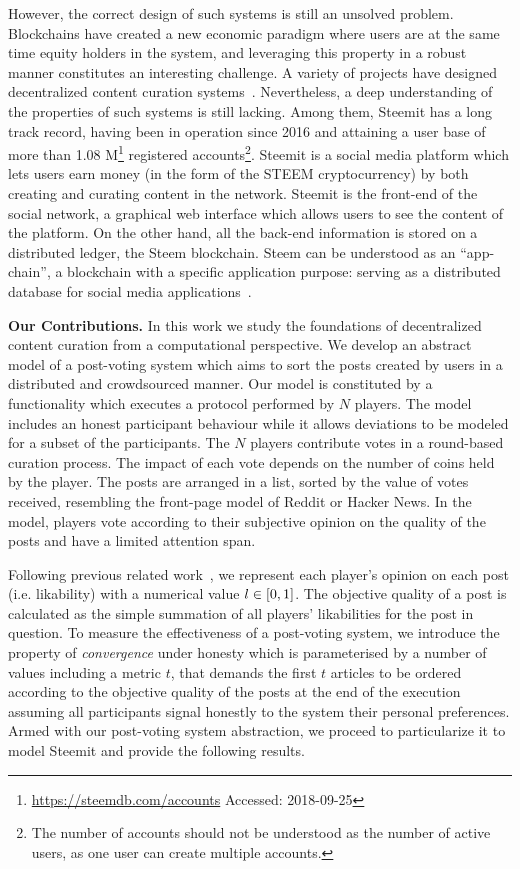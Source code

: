    However, the correct design of such systems is still an unsolved problem. Blockchains have created a new economic paradigm where users are at the same time equity holders in the system, and leveraging this property in a robust manner constitutes an interesting challenge.
   A variety of projects have designed decentralized content curation systems~\cite{synereo,steemit,tcr}. Nevertheless, a deep understanding of the properties of such systems is still lacking. Among them, Steemit
has a long track record, having been in operation since 2016 and attaining a user base of more than 1.08 M\footnote{\url{https://steemdb.com/accounts} Accessed: 2018-09-25} registered accounts\footnote{The number of accounts should not be understood as the number of active users, as one user can create multiple accounts.}. Steemit is a social media platform which lets users earn money (in the form of the STEEM cryptocurrency) by both creating and curating content in the network. Steemit is the front-end of the social network, a graphical web interface which allows users to see the content of the platform. On the other hand, all the back-end information is stored on a distributed ledger, the Steem blockchain. Steem can be understood as an ``app-chain'', a blockchain with a specific application purpose: serving as a distributed database for social media applications~\cite{steemit}.

\noindent  \textbf{Our Contributions.}
In this work we study the foundations of decentralized content curation from a computational perspective. We develop an abstract model of a post-voting system which aims to sort the posts created by users in a distributed and crowdsourced manner.
  Our model is constituted by a functionality which executes a protocol performed by $N$ players. The model includes an honest participant behaviour while it allows deviations to be modeled for a subset of the participants.      The $N$ players contribute votes in a round-based curation process. The impact of each vote depends on the number of coins held by the player.
   The posts are arranged in a list, sorted by the value of votes received, resembling the front-page model of Reddit or Hacker News. In the model, players vote according to their subjective opinion on the quality of the posts and have a limited attention span.

   Following previous related work~\cite{ghosh2011incentivizing,askalidis2013theoretical}, we represent each player's opinion on each post (i.e. likability) with a numerical value $l \in [ 0,1 ]$.
   The objective quality of a post is calculated as the simple summation of all players' likabilities for the post in question. 
   To measure the effectiveness of a post-voting system, we introduce the property of  \textit{convergence} under honesty which is parameterised by a number of values including a metric $t$, that demands the  first $t$ articles to be   ordered according to the objective quality of the posts at the end of the execution assuming all participants signal honestly to the system their personal preferences. 
Armed with our  post-voting system abstraction, we proceed to particularize it to model Steemit and provide the following results. 

